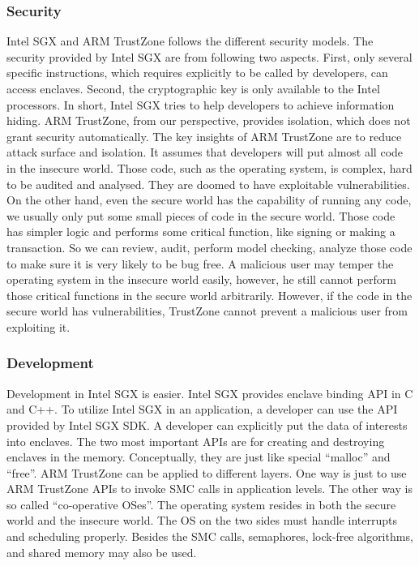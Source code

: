 \subsubsection{Security}
Intel SGX and ARM TrustZone follows the different security models.
The security provided by Intel SGX are from following two aspects.
First, only several specific instructions, which requires explicitly 
to be called by developers, can access enclaves. Second, the 
cryptographic key is only available to the Intel processors. In short,
Intel SGX tries to help developers to achieve information hiding.
ARM TrustZone, from our perspective, provides isolation, which does
not grant security automatically. The key insights of ARM TrustZone are to
reduce attack surface and isolation. It assumes that developers will 
put almost all code in the insecure world. Those code, such as the 
operating system, is complex, hard to be audited and analysed. They are 
doomed to have exploitable vulnerabilities. On the other hand, even the 
secure world has the capability of running any code, we usually only put 
some small pieces of code in the secure world. Those code has simpler 
logic and performs some critical function, like signing or making a transaction.
So we can review, audit, perform model checking, analyze those code
to make sure it is very likely to be bug free. A malicious user
may temper the operating system in the insecure world easily, however,
he still cannot perform those critical functions in the secure world 
arbitrarily. However, if the code in the secure world has vulnerabilities,
TrustZone cannot prevent a malicious user from exploiting it.             




\subsubsection{Development}
Development in Intel SGX is easier. Intel SGX provides enclave 
binding API in C and C++. To utilize Intel SGX in an application,
a developer can use the API provided by Intel SGX SDK. A developer
can explicitly put the data of interests into enclaves. 
The two most important APIs are for creating and destroying enclaves 
in the memory. Conceptually, they are just like special ``malloc''
and ``free''. ARM TrustZone can be applied to different layers. 
One way is just to use ARM TrustZone APIs to invoke SMC calls in 
application levels. The other way is so called ``co-operative OSes''.
The operating system resides in both the secure world and the 
insecure world. The OS on the two sides must handle interrupts and
scheduling properly. Besides the SMC calls, semaphores, lock-free
algorithms, and shared memory may also be used.       
  

